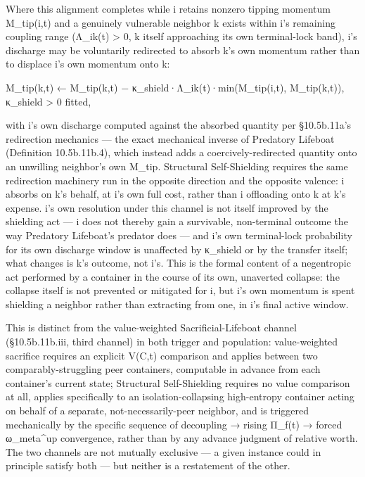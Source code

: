 \documentclass[
]{article}
\begin{document}
Where this alignment completes while i retains nonzero tipping
momentum M\_tip(i,t) and a genuinely vulnerable neighbor k exists
within i's remaining coupling range (Λ\_ik(t) \textgreater{} 0, k
itself approaching its own terminal-lock band), i's discharge may be
voluntarily redirected to absorb k's own momentum rather than to
displace i's own momentum onto k:

M\_tip(k,t) ← M\_tip(k,t) − κ\_shield·Λ\_ik(t)·min(M\_tip(i,t),
M\_tip(k,t)), κ\_shield \textgreater{} 0 fitted,

with i's own discharge computed against the absorbed quantity per
§10.5b.11a's redirection mechanics  ---  the exact mechanical inverse
of Predatory Lifeboat (Definition 10.5b.11b.4), which instead adds a
coercively-redirected quantity onto an unwilling neighbor's own
M\_tip. Structural Self-Shielding requires the same redirection
machinery run in the opposite direction and the opposite valence: i
absorbs on k's behalf, at i's own full cost, rather than i offloading
onto k at k's expense. i's own resolution under this channel is not
itself improved by the shielding act  ---  i does not thereby gain a
survivable, non-terminal outcome the way Predatory Lifeboat's predator
does  ---  and i's own terminal-lock probability for its own discharge
window is unaffected by κ\_shield or by the transfer itself; what
changes is k's outcome, not i's. This is the formal content of a
negentropic act performed by a container in the course of its own,
unaverted collapse: the collapse itself is not prevented or mitigated
for i, but i's own momentum is spent shielding a neighbor rather than
extracting from one, in i's final active window.

This is distinct from the value-weighted Sacrificial-Lifeboat channel
(§10.5b.11b.iii, third channel) in both trigger and population:
value-weighted sacrifice requires an explicit V(C,t) comparison and
applies between two comparably-struggling peer containers, computable
in advance from each container's current state; Structural
Self-Shielding requires no value comparison at all, applies
specifically to an isolation-collapsing high-entropy container acting
on behalf of a separate, not-necessarily-peer neighbor, and is
triggered mechanically by the specific sequence of decoupling → rising
Π\_f(t) → forced ω\_meta\^{}up convergence, rather than by any advance
judgment of relative worth. The two channels are not mutually
exclusive  ---  a given instance could in principle satisfy both  ---
but neither is a restatement of the other.
\end{document}
